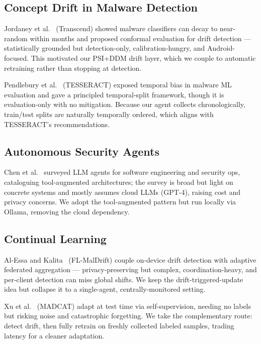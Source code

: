 \documentclass[12pt,a4paper]{article}
\begin{document}
\subsection{Concept Drift in Malware Detection}

Jordaney et al.~\cite{jordaney2017transcend} (Transcend) showed malware classifiers can decay to near-random within months and proposed conformal evaluation for drift detection --- statistically grounded but detection-only, calibration-hungry, and Android-focused. This motivated our PSI+DDM drift layer, which we couple to automatic retraining rather than stopping at detection.

Pendlebury et al.~\cite{pendlebury2019tesseract} (TESSERACT) exposed temporal bias in malware ML evaluation and gave a principled temporal-split framework, though it is evaluation-only with no mitigation. Because our agent collects chronologically, train/test splits are naturally temporally ordered, which aligns with TESSERACT's recommendations.

\subsection{Autonomous Security Agents}

Chen et al.~\cite{chen2024llmagent} surveyed LLM agents for software engineering and security ops, cataloguing tool-augmented architectures; the survey is broad but light on concrete systems and mostly assumes cloud LLMs (GPT-4), raising cost and privacy concerns. We adopt the tool-augmented pattern but run locally via Ollama, removing the cloud dependency.

\subsection{Continual Learning}

Al-Essa and Kalita~\cite{flmaldrift2025} (FL-MalDrift) couple on-device drift detection with adaptive federated aggregation --- privacy-preserving but complex, coordination-heavy, and per-client detection can miss global shifts. We keep the drift-triggered-update idea but collapse it to a single-agent, centrally-monitored setting.

Xu et al.~\cite{xu2024madcat} (MADCAT) adapt at test time via self-supervision, needing no labels but risking noise and catastrophic forgetting. We take the complementary route: detect drift, then fully retrain on freshly collected labeled samples, trading latency for a cleaner adaptation.
\end{document}
